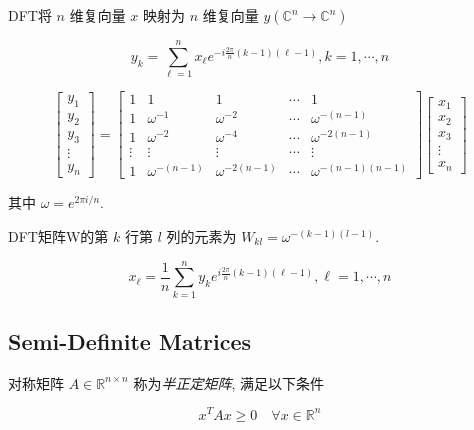 \begin{definition}
    DFT将 $ n $ 维复向量 $ x $ 映射为 $ {n} $ 维复向量 $ y\left(\mathbb{C}^{n} \rightarrow \mathbb{C}^{n}\right) $

    $$ y_{k}=\sum_{\ell=1}^{n} x_{\ell} e^{-i \frac{2 \pi}{n}(k-1)(\ell-1)}, k=1, \cdots, n $$

    $$ \left[\begin{array}{c}y_{1} \\ y_{2} \\ y_{3} \\ \vdots \\ y_{n}\end{array}\right]=\left[\begin{array}{ccccc}1 & 1 & 1 & \cdots & 1 \\ 1 & \omega^{-1} & \omega^{-2} & \cdots & \omega^{-(n-1)} \\ 1 & \omega^{-2} & \omega^{-4} & \cdots & \omega^{-2(n-1)} \\ \vdots & \vdots & \vdots & \cdots & \vdots \\ 1 & \omega^{-(n-1)} & \omega^{-2(n-1)} & \cdots & \omega^{-(n-1)(n-1)}\end{array}\right]\left[\begin{array}{c}x_{1} \\ x_{2} \\ x_{3} \\ \vdots \\ x_{n}\end{array}\right] $$

   其中 $ \omega=e^{2 \pi i / n} $.
\end{definition}

DFT矩阵W的第 $ k $ 行第 $ l $ 列的元素为 $ W_{k l}=\omega^{-(k-1)(l-1)} $.

\begin{definition}
    $$ x_{\ell}=\frac{1}{n} \sum_{k=1}^{n} y_{k} e^{i \frac{2 \pi}{n}(k-1)(\ell-1)}, \ell=1, \cdots, n $$
\end{definition}

\subsection{Semi-Definite Matrices}

\begin{definition}[半正定矩阵]
    对称矩阵 $ A \in \mathbb{R}^{n \times n} $ 称为\textit{半正定矩阵}, 满足以下条件

$$
x^{T} A x \geq 0 \quad \forall x \in \mathbb{R}^{n}
$$
\end{definition}

